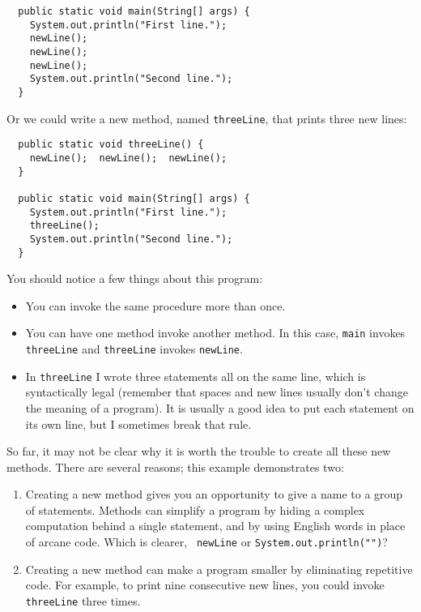 \documentclass{book}
\begin{document}
\begin{verbatim}
  public static void main(String[] args) {
    System.out.println("First line.");
    newLine();
    newLine();
    newLine();
    System.out.println("Second line.");
  }
\end{verbatim}
%
Or we could write a new method, named {\tt threeLine}, that 
prints three new lines:

\begin{verbatim}
  public static void threeLine() {
    newLine();  newLine();  newLine();
  }

  public static void main(String[] args) {
    System.out.println("First line.");
    threeLine();
    System.out.println("Second line.");
  }
\end{verbatim}
%
You should notice a few things about this program:

\begin{itemize}

\item You can invoke the same procedure more than once.

\item You can have one method invoke another method.  In this
case, {\tt main} invokes {\tt threeLine} and {\tt threeLine}
invokes {\tt newLine}.

\item In {\tt threeLine} I wrote three statements all on the same
  line, which is syntactically legal (remember that spaces and new
  lines usually don't change the meaning of a program).  It is usually
  a good idea to put each statement on its own line, but I sometimes
  break that rule.

\end{itemize}

So far, it may not be clear why it is worth the trouble to
create all these new methods.  There are several
reasons; this example demonstrates two:

\begin{enumerate}

\item Creating a new method gives you an opportunity to
give a name to a group of statements.  Methods can simplify a program
by hiding a complex computation behind a single statement, and by using
English words in place of arcane code.  Which is clearer, {\tt
newLine} or {\tt System.out.println("")}?

\item Creating a new method can make a program smaller by eliminating
repetitive code.  For example, to print nine consecutive
new lines, you could invoke {\tt threeLine} three times.

\end{enumerate}
\end{document}
